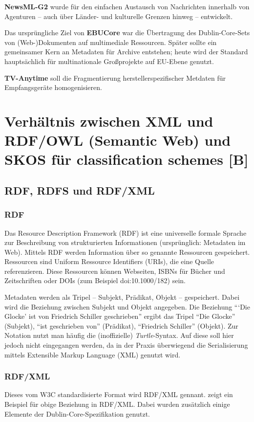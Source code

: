 	\textbf{NewsML-G2} wurde für den einfachen Austausch von Nachrichten innerhalb von Agenturen -- auch über Länder- und kulturelle Grenzen hinweg -- entwickelt. 
	
	Das ursprüngliche Ziel von \textbf{EBUCore} war die Übertragung des Dublin-Core-Sets von (Web-)Dokumenten auf multimediale Ressourcen. Später sollte ein gemeinsamer Kern an Metadaten für Archive entstehen; heute wird der Standard hauptsächlich für multinationale Großprojekte auf EU-Ebene genutzt. 
	
	\textbf{TV-Anytime} soll die Fragmentierung herstellerspezifischer Metdaten für Empfangsgeräte homogenisieren. 
	
	\section{Verhältnis zwischen XML und RDF/OWL (Semantic Web) und SKOS für classification schemes \hfill [B]}
	\subsection{RDF, RDFS und RDF/XML}\cite{Hitzler:2008}
	\subsubsection{RDF}
	Das Resource Description Framework (RDF) ist eine universelle formale Sprache zur Beschreibung von strukturierten Informationen (ursprünglich: Metadaten im Web). Mittels RDF werden Information über so genannte Ressourcen gespeichert. Ressourcen sind Uniform Ressource Identifiers (URIs), die eine Quelle referenzieren. Diese Ressourcen können Webseiten, ISBNs für Bücher und Zeitschriften oder DOIs (zum Beispiel doi:10.1000/182) sein.
	
	Metadaten werden als Tripel -- Subjekt, Prädikat, Objekt -- gespeichert. Dabei wird die Beziehung zwischen Subjekt und Objekt angegeben. Die Beziehung \enquote{\enquote{Die Glocke} ist von Friedrich Schiller geschrieben} ergibt das Tripel \enquote{Die Glocke} (Subjekt), \enquote{ist geschrieben von} (Prädikat), \enquote{Friedrich Schiller} (Objekt). Zur Notation nutzt man häufig die (inoffizielle) \emph{Turtle}-Syntax.
	Auf diese soll hier jedoch nicht eingegangen werden, da in der Praxis überwiegend die Serialisierung mittels Extensible Markup Language (XML) genutzt wird.
	
	\subsubsection{RDF/XML}
	Dieses vom W3C standardisierte Format wird RDF/XML gennant.  zeigt ein Beispiel für obige Beziehung in RDF/XML. Dabei wurden zusätzlich einige Elemente der Dublin-Core-Spezifikation genutzt.
	


